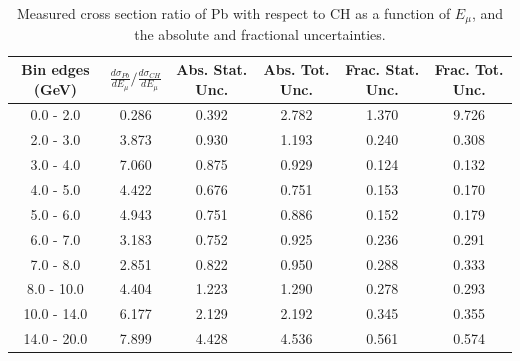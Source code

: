 \documentclass[aps,prl,twocolumn,superscriptaddress,nofootinbib]{revtex4-1}
\begin{document}
\begin{table}[h!]
  \centering
  \caption{Measured cross section ratio of Pb with respect to CH as a function
  of $E_{\mu}$,  and the absolute and fractional uncertainties.}
    \begin{tabular}{c||c||c|c||c|c}
      Bin edges (GeV) & $\frac{d\sigma_{Pb}}{dE_{\mu}}/\frac{d\sigma_{CH}}{dE_{\mu}}$ & Abs. Stat. Unc. & Abs. Tot. Unc. & Frac. Stat. Unc. & Frac. Tot. Unc. \\
      \hline\hline
        0.0 - 2.0 & 0.286 & 0.392 & 2.782 & 1.370 & 9.726 \\
        2.0 - 3.0 & 3.873 & 0.930 & 1.193 & 0.240 & 0.308 \\
        3.0 - 4.0 & 7.060 & 0.875 & 0.929 & 0.124 & 0.132 \\
        4.0 - 5.0 & 4.422 & 0.676 & 0.751 & 0.153 & 0.170 \\
        5.0 - 6.0 & 4.943 & 0.751 & 0.886 & 0.152 & 0.179 \\
        6.0 - 7.0 & 3.183 & 0.752 & 0.925 & 0.236 & 0.291 \\
        7.0 - 8.0 & 2.851 & 0.822 & 0.950 & 0.288 & 0.333 \\
       8.0 - 10.0 & 4.404 & 1.223 & 1.290 & 0.278 & 0.293 \\
      10.0 - 14.0 & 6.177 & 2.129 & 2.192 & 0.345 & 0.355 \\
      14.0 - 20.0 & 7.899 & 4.428 & 4.536 & 0.561 & 0.574 \\
    \end{tabular}
  \label{table:EmuXSecRatio_Pb}
\end{table}
\end{document}
